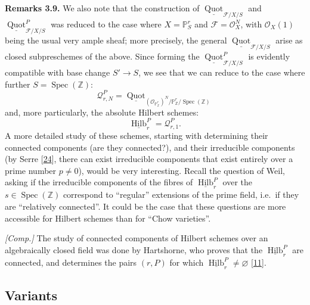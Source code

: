 \documentclass{article}
\newenvironment{rmenv}[1]
  {\phantomsection\par\smallskip\noindent\textbf{#1.}\rmfamily}
  {\par\smallskip}
\theoremstyle{definition}
\theoremstyle{definition}
\theoremstyle{definition}
\theoremstyle{definition}
\theoremstyle{remark}
\begin{document}
\leavevmode{}%
\begin{rmenv}{Remarks 3.9}
We also note that the construction of \(\underline{\operatorname{Quot}}_{{{\mathscr{F}}/X/S}}\) and \(\underline{\operatorname{Quot}}_{{{\mathscr{F}}/X/S}}^P\) was reduced to the case where \(X=\mathbb{P}_S^r\) and \({\mathscr{F}}={\mathscr{O}}_X^N\), with \({\mathscr{O}}_X(1)\) being the usual very ample sheaf;
more precisely, the general \(\underline{\operatorname{Quot}}_{{{\mathscr{F}}/X/S}}\) arise as closed subpreschemes of the above.
Since forming the \(\underline{\operatorname{Quot}}_{{{\mathscr{F}}/X/S}}^P\) is evidently compatible with base change \(S'\to S\), we see that we can reduce to the case where further \(S=\operatorname{Spec}(\mathbb{Z})\):
\[
  {\mathscr{Q}}_{r,N}^P = \underline{\operatorname{Quot}}_{({\mathscr{O}}_{\mathbb{P}_{\mathbb{Z}}^r})^N/\mathbb{P}_{\mathbb{Z}}^r/\operatorname{Spec}(\mathbb{Z})}
\]
and, more particularly, the absolute Hilbert schemes:
\[
  \underline{\operatorname{Hilb}}_r^P = {\mathscr{Q}}_{r,1}^P.
\]
A more detailed study of these schemes, starting with determining their connected components (are they connected?), and their irreducible components (by Serre {[}\protect\hyperlink{ref-Ser1961}{24}{]}, there can exist irreducible components that exist entirely over a prime number \(p\neq0\)), would be very interesting.
Recall the question of Weil, asking if the irreducible components of the fibres of \(\underline{\operatorname{Hilb}}_r^P\) over the \(s\in\operatorname{Spec}(\mathbb{Z})\) correspond to ``regular'' extensions of the prime field, i.e.~if they are ``relatively connected''.
It could be the case that these questions are more accessible for Hilbert schemes than for ``Chow varieties''.

\emph{{[}Comp.{]}}
The study of connected components of Hilbert schemes over an algebraically closed field was done by Hartshorne, who proves that the \(\underline{\operatorname{Hilb}}_r^P\) are connected, and determines the pairs \((r,P)\) for which \(\underline{\operatorname{Hilb}}_r^P\neq\varnothing\) {[}\protect\hyperlink{ref-Har1966}{11}{]}.

\end{rmenv}

\hypertarget{fga-3-iv-section-4}{%
\subsection{Variants}\label{fga-3-iv-section-4}}
\end{document}
